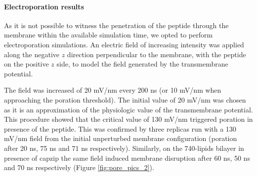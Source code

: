 \paragraph{Electroporation results}
As it is not possible to witness the penetration of the peptide through the membrane within the available simulation time, we opted to perform electroporation simulations.
%
An electric field of increasing intensity was applied along the negative $z$ direction perpendicular to the membrane, with the peptide on the positive $z$ side, to model the field generated by the transmembrane potential.

The field was increased of 20 mV/nm every 200 ns (or 10 mV/nm when approaching the poration threshold). The initial value of 20 mV/nm was chosen as it is an approximation of the physiologic value of the transmembrane potential. This procedure showed that the critical value of 130 mV/nm triggered poration in presence of the peptide. 
%
This was confirmed by three replicas run with a 130 mV/nm field from the initial unperturbed membrane configuration (poration after 20 ns, 75 ns and 71 ns respectively).
%
Similarly, on the 740-lipids bilayer in presence of capzip the same field induced membrane disruption after 60 ns, 50 ns and 70 ns respectively (Figure \ref{fig:pore_pics_2}).

